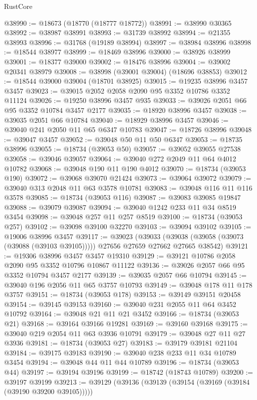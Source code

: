 \begin{lexlean}{RustCore}
\begin{coremodule}
@38990 := @18673 (@18770 (@18777 @18772))
@38991 := @38990 @30365
@38992 := @38987 @38991
@38993 := @31739 @38992
@38994 := @21355 @38993
@38996 := @31768 (@19189 @38994)
@38997 := @38984 @38996
@38998 := @18544 @38977
@38999 := @18469 @38996
@39000 := @38926 @38999
@39001 := @18377 @39000
@39002 := @18476 @38996
@39004 := @39002 @20341 @38979
@39008 := @38998 (@39001 @39004) (@18696 @38853)
@39012 := @18544 @39000 @39004 (@18701 @38925)
@39015 := @19235 @38996 @3457 @3457
@39023 := @39015 @2052 @2058 @2090 @95 @3352 @10786 @3352 @11124
@39026 := @19250 @38996 @3457 @935
@39033 := @39026 @2051 @66 @95 @3352 @10784 @3457 @2177
@39035 := @18920 @38996 @3457
@39038 := @39035 @2051 @66 @10784
@39040 := @18929 @38996 @3457
@39046 := @39040 @241 @2050 @11 @65 @6347 @10783
@39047 := @18726 @38996
@39048 := @39047 @3457
@39052 := @39048 @50 @11 @50 @6347
@39053 := @18735 @38996
@39055 := @18734 (@39053 @50)
@39057 := @39052 @39055 @27538
@39058 := @39046 @39057
@39064 := @39040 @272 @2049 @11 @64 @4012 @10782
@39068 := @39048 @190 @11 @190 @4012
@39070 := @18734 (@39053 @190)
@39072 := @39068 @39070 @21424
@39073 := @39064 @39072
@39079 := @39040 @313 @2048 @11 @63 @3578 @10781
@39083 := @39048 @116 @11 @116 @3578
@39085 := @18734 (@39053 @116)
@39087 := @39083 @39085 @19847
@39088 := @39079 @39087
@39094 := @39040 @1242 @233 @11 @34 @8519 @3454
@39098 := @39048 @257 @11 @257 @8519
@39100 := @18734 (@39053 @257)
@39102 := @39098 @39100 @32270
@39103 := @39094 @39102
@39105 := @19006 @38996 @3457
@39117 := @39023
    (@39033 (@39038 (@39058 (@39073 (@39088 (@39103 @39105))))) @27656 @27659 @27662 @27665 @38542)
@39121 := @19306 @38996 @3457 @3457 @19310
@39129 := @39121 @10786 @2058 @2090 @95 @3352 @10796 @10867 @11122
@39136 := @39026 @2057 @66 @95 @3352 @10794 @3457 @2177
@39139 := @39035 @2057 @66 @10794
@39145 := @39040 @196 @2056 @11 @65 @3757 @10793
@39149 := @39048 @178 @11 @178 @3757
@39151 := @18734 (@39053 @178)
@39153 := @39149 @39151 @20458
@39154 := @39145 @39153
@39160 := @39040 @231 @2055 @11 @64 @3452 @10792
@39164 := @39048 @21 @11 @21 @3452
@39166 := @18734 (@39053 @21)
@39168 := @39164 @39166 @19281
@39169 := @39160 @39168
@39175 := @39040 @219 @2054 @11 @63 @3936 @10791
@39179 := @39048 @27 @11 @27 @3936
@39181 := @18734 (@39053 @27)
@39183 := @39179 @39181 @21104
@39184 := @39175 @39183
@39190 := @39040 @238 @233 @11 @34 @10789 @3454
@39194 := @39048 @44 @11 @44 @10789
@39196 := @18734 (@39053 @44)
@39197 := @39194 @39196
@39199 := @18742 (@18743 @10789)
@39200 := @39197 @39199
@39213 := @39129
    (@39136
      (@39139 (@39154 (@39169 (@39184 (@39190 @39200 @39105)))))

\end{coremodule}
\end{lexlean}
